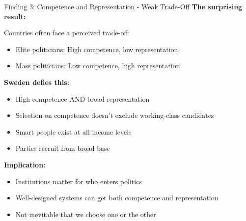 \documentclass[10pt]{beamer}
\begin{document}
\begin{frame}{Finding 3: Competence and Representation - Weak Trade-Off}
\textbf{The surprising result:}


Countries often face a perceived trade-off:
\begin{itemize}
\item Elite politicians: High competence, low representation
\item Mass politicians: Low competence, high representation
\end{itemize}



\textbf{Sweden defies this:}
\begin{itemize}
\item \alert{High competence AND broad representation}
\item Selection on competence doesn't exclude working-class candidates
\item Smart people exist at all income levels
\item Parties recruit from broad base
\end{itemize}



\textbf{Implication:}
\begin{itemize}
\item Institutions matter for who enters politics
\item Well-designed systems can get both competence and representation
\item Not inevitable that we choose one or the other
\end{itemize}
\end{frame}
\end{document}
